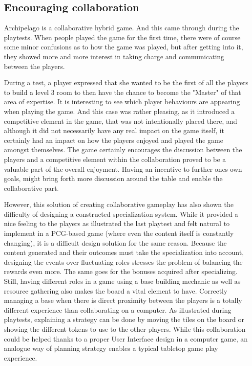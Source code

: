 \subsection{Encouraging collaboration} 
Archipelago is a collaborative hybrid game. And this came through during the playtests. When people played the game for the first time, there were of course some minor confusions as to how the game was played, but after getting into it, they showed more and more interest in taking charge and communicating between the players. 

During a test, a player expressed that she wanted to be the first of all the players to build a level 3 room to then have the chance to become the "Master" of that area of expertise. It is interesting to see which player behaviours are appearing when playing the game. And this case was rather pleasing, as it introduced a competitive element in the game, that was not intentionally placed there, and although it did not necessarily have any real impact on the game itself, it certainly had an impact on how the players enjoyed and played the game amongst themselves. The game certainly encourages the discussion between the players and a competitive element within the collaboration proved to be a valuable part of the overall enjoyment. Having an incentive to further ones own goals, might bring forth more discussion around the table and enable the collaborative part.

However, this solution of creating collaborative gameplay has also shown the difficulty of designing a constructed specialization system. While it provided a nice feeling to the players as illustrated the last playtest and felt natural to implement in a PCG-based game (where even the content itself is constantly changing), it is a difficult design solution for the same reason. Because the content generated and their outcomes must take the specialization into account, designing the events over fluctuating roles stresses the problem of balancing the rewards even more. The same goes for the bonuses acquired after specializing. Still, having different roles in a game using a base building mechanic as well as resource gathering also makes the board a vital element to have. Correctly managing a base when there is direct proximity between the players is a totally different experience than collaborating on a computer. As illustrated during playtests, explaining a strategy can be done by moving the tiles on the board or showing the different tokens to use to the other players. While this collaboration could be helped thanks to a proper User Interface design in a computer game, an analogue way of planning strategy enables a typical tabletop game play experience.

